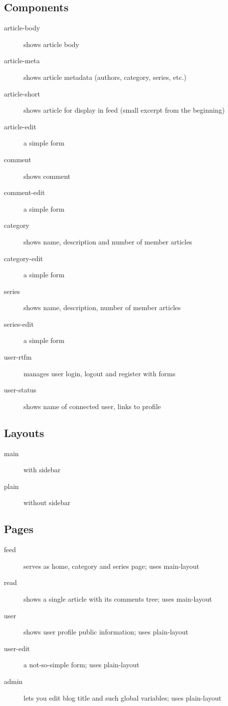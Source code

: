 \documentclass[a4paper, 11pt]{article}
\begin{document}
\subsection{Components}
\begin{description}
	\item[article-body] shows article body
	\item[article-meta] shows article metadata (authors, category, series, etc.)
	\item[article-short] shows article for display in feed (small excerpt from the beginning)
	\item[article-edit] a simple form
	\item[comment] shows comment
	\item[comment-edit] a simple form
	\item[category] shows name, description and number of member articles
	\item[category-edit] a simple form
	\item[series] shows name, description, number of member articles
	\item[series-edit] a simple form
	\item[user-rtfm] manages user login, logout and register with forms
	\item[user-status] shows name of connected user, links to profile
\end{description}

\subsection{Layouts}
\begin{description}
	\item[main] with sidebar
	\item[plain] without sidebar
\end{description}

\subsection{Pages}
\begin{description}
	\item[feed] serves as home, category and series page; uses main-layout
	\item[read] shows a single article with its comments tree; uses main-layout
	\item[user] shows user profile public information; uses plain-layout
	\item[user-edit] a not-so-simple form; uses plain-layout
	\item[admin] lets you edit blog title and such global variables; uses plain-layout
\end{description}
\end{document}
